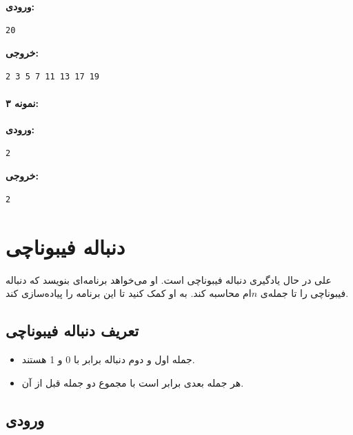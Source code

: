\documentclass{article}
\begin{document}
\textbf{ورودی:}
\begin{LTR}
\begin{verbatim}
20
\end{verbatim}
\end{LTR}

\textbf{خروجی:}
\begin{LTR}
\begin{verbatim}
2 3 5 7 11 13 17 19
\end{verbatim}
\end{LTR}

\paragraph{نمونه ۳:}

\textbf{ورودی:}
\begin{LTR}
\begin{verbatim}
2
\end{verbatim}
\end{LTR}

\textbf{خروجی:}
\begin{LTR}
\begin{verbatim}
2
\end{verbatim}
\end{LTR}

\newpage

\section{دنباله فیبوناچی}

علی در حال یادگیری دنباله فیبوناچی است. او می‌خواهد برنامه‌ای بنویسد که دنباله فیبوناچی را تا جمله‌ی \( n \)ام محاسبه کند. به او کمک کنید تا این برنامه را پیاده‌سازی کند.

\subsection{تعریف دنباله فیبوناچی}

\begin{itemize}
    \item جمله اول و دوم دنباله برابر با 0 و 1 هستند.
    \item هر جمله بعدی برابر است با مجموع دو جمله قبل از آن. 
\end{itemize}

\subsection{ورودی}
\end{document}

